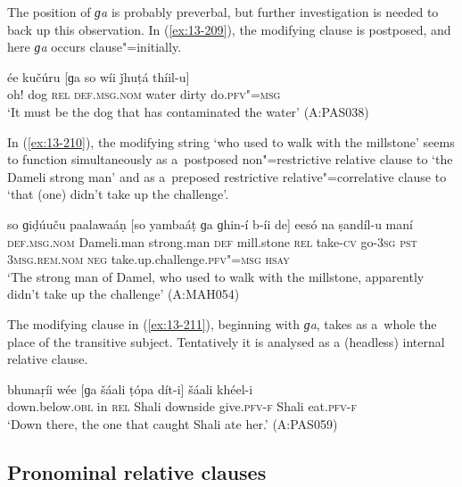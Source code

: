 The position of \textit{ɡa} is probably preverbal, but further investigation is needed to back up this observation. In (\ref{ex:13-209}), the modifying clause is postposed, and here \textit{ɡa} occurs clause"=initially.

\begin{exe}
\ex
\label{ex:13-209}
\gll ée kučúru [ɡa so wíi ǰhuṭá thíil-u]  \\
oh! dog \textsc{rel} \textsc{def.msg.nom} water dirty do.\textsc{pfv"=msg} \\
\glt `It must be the dog that has contaminated the water' (A:PAS038) 
\end{exe}

In (\ref{ex:13-210}), the modifying string `who used to walk with the millstone' seems to function simultaneously as a~postposed non"=restrictive relative clause to `the Dameli strong man' and as a~preposed restrictive relative"=correlative clause to `that (one) didn't take up the challenge'.

\begin{exe}
\ex
\label{ex:13-210}
\gll so ɡiḍúuču paalawaáṇ [so yambaáṭ  ɡa ɡhin-í b-íi de] eesó na  ṣandíl-u maní \\
\textsc{def.msg.nom} Dameli.man strong.man \textsc{def} mill.stone \textsc{rel} take-\textsc{cv} go-\textsc{3sg} \textsc{pst} \textsc{3msg.rem.nom} \textsc{neg} take.up.challenge.\textsc{pfv"=msg} \textsc{hsay} \\
\glt `The strong man of Damel, who used to walk with the millstone, apparently didn't take up the
challenge' (A:MAH054)
\end{exe}

The modifying clause in (\ref{ex:13-211}), beginning with \textit{ɡa}, takes as a~whole the place of the transitive subject. Tentatively it is analysed as a (headless) internal relative clause.

\begin{exe}
\ex
\label{ex:13-211}
\gll bhunaṛíi wée [ɡa šáali ṭópa dít-i]  šáali khéel-i \\
down.below.\textsc{obl} in \textsc{rel} Shali downside give.\textsc{pfv-f} Shali eat.\textsc{pfv-f} \\
\glt `Down there, the one that caught Shali ate her.' (A:PAS059)
\end{exe}

\subsection{Pronominal relative clauses}
\label{subsec:13-6-5}


